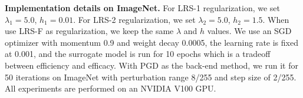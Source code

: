 \documentclass[letterpaper]{article} %
\theoremstyle{plain}
\theoremstyle{definition}
\begin{document}
\textbf{Implementation details on ImageNet.} For LRS-1 regularization, we set $\lambda_1=5.0$, $h_1=0.01$. For LRS-2 regularization, we set $\lambda_2=5.0$, $h_2=1.5$. When use LRS-F as regularization, we keep the same $\lambda$ and $h$ values. We use an SGD optimizer with momentum 0.9 and weight decay 0.0005, the learning rate is fixed at 0.001, and the surrogate model is run for 10 epochs which is a tradeoff between efficiency and efficacy. With PGD as the back-end method, we run it for 50 iterations on ImageNet with perturbation range 8/255 and step size of 2/255. All experiments are performed on an NVIDIA V100 GPU.



\begin{table}[ht!]
\begin{center}
\end{center}
\end{table}
\end{document}
